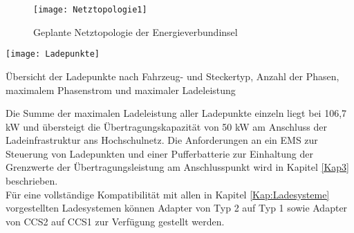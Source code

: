 		\begin{figure}[h] %
			\centering
			\texttt{[image: Netztopologie1]}
			\caption{Geplante Netztopologie der Energieverbundinsel}
			\label{Abb:Netztopologie}
		\end{figure}		
			
		\begin{table}[h]
			\centering
			\texttt{[image: Ladepunkte]}
			\caption{Übersicht der Ladepunkte nach Fahrzeug- und Steckertyp, Anzahl der Phasen, maximalem Phasenstrom und maximaler Ladeleistung}
			\label{Tab:Ladepunkte}
		\end{table}	
	
		Die Summe der maximalen Ladeleistung aller Ladepunkte einzeln liegt bei 106,7 kW und übersteigt die Übertragungskapazität von 50 kW am Anschluss der Ladeinfrastruktur ans Hochschulnetz. Die Anforderungen an ein EMS zur Steuerung von Ladepunkten und einer Pufferbatterie zur Einhaltung der Grenzwerte der Übertragungsleistung am Anschlusspunkt wird in Kapitel \ref{Kap3} beschrieben.\\
		
		Für eine vollständige Kompatibilität mit allen in Kapitel \ref{Kap:Ladesysteme} vorgestellten Ladesystemen können Adapter von Typ 2 auf Typ 1 sowie Adapter von CCS2 auf CCS1 zur Verfügung gestellt werden.\\
		


	
				

